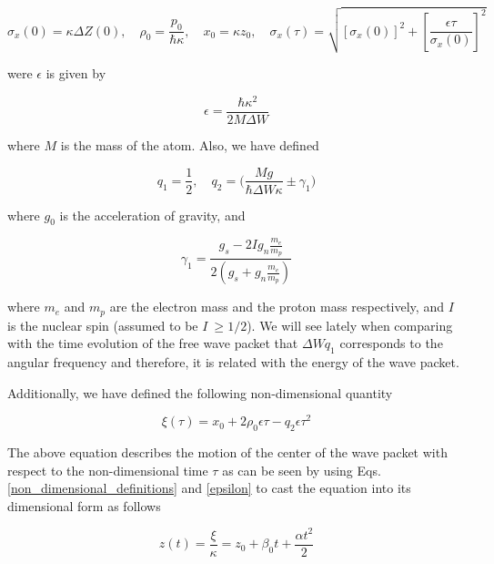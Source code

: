 \documentclass{article}
\begin{document}
\begin{equation}\label{non_dimensional_definitions}
\sigma_{x}(0) = \kappa \Delta Z(0)\mathrm{,}\quad \rho_{0}=\frac{p_{0}}{\hbar \kappa} \mathrm{,}\quad 
x_{0}=\kappa z_{0} \mathrm{,}\quad 
\sigma_{x}(\tau) = \sqrt{[\sigma_{x}(0)]^{2} + \left[\frac{\epsilon \tau}{\sigma_{x}(0)} \right]^{2}}
\end{equation}

were $\epsilon$ is given by 

\begin{equation}\label{epsilon}
\epsilon = \frac{\hbar \kappa^{2}}{2 M \Delta W}
\end{equation}

where $M$ is the mass of the atom. Also, we have defined

\begin{equation}\label{q1_q2}
q_{1} = \frac{1}{2} \mathrm{,}\quad q_{2} = \bigg(\frac{M g}{\hbar \Delta W \kappa} \pm  \gamma_{1} \bigg)
\end{equation}

where $g_{0}$ is the acceleration of gravity, and 

\begin{equation}\label{gamma_1}
\gamma_{1} = \frac{g_{s}-2 I g_{n} \frac{m_{e}}{m_{p}}}{2(g_{s}+g_{n}\frac{m_{e}}{m_{p}})}
\end{equation}

where $m_{e}$ and $m_{p}$ are the electron mass and the proton mass respectively, and $I$ is the nuclear spin (assumed to be $I\ \ge 1/2$).
We will see lately when comparing with the time evolution of the free wave packet that $\Delta W q_{1}$ corresponds to the angular frequency and therefore, it is related with the energy of the wave packet.


Additionally, we have defined the following non-dimensional quantity

\begin{equation}\label{xi}
\xi(\tau) = x_{0} + 2 \rho_{0} \epsilon \tau - q_{2}\epsilon \tau^{2}
\end{equation}

The above equation describes the motion of the center of the wave packet with respect to the non-dimensional time $\tau$ as can be seen by using Eqs. \ref{non_dimensional_definitions} and \ref{epsilon} to cast the equation into its dimensional form as follows

\begin{equation}\label{xi_dimensional}
z(t) = \frac{\xi}{\kappa} = z_{0} +  \beta_{0} t +  \frac{\alpha t^{2}}{2}
\end{equation}
\end{document}
